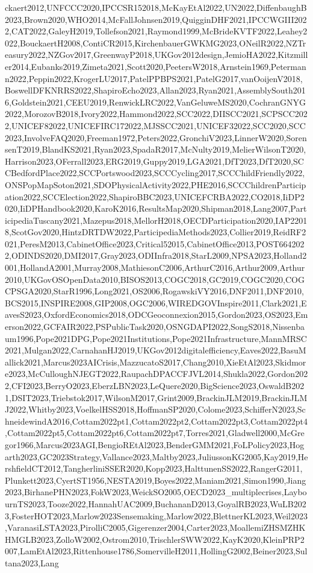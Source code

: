 \documentclass[a4paper]{article} %
\begin{document}
\begin{refsection}
ckaert2012,UNFCCC2020,IPCCSR152018,McKayEtAl2022,UN2022,DiffenbaughB2023,Brown2020,WHO2014,McFallJohnsen2019,QuigginDHF2021,IPCCWGIII2022,CAT2022,GaleyH2019,Tollefson2021,Raymond1999,McBrideKVTF2022,Leahey2022,BouckaertH2008,ContiCR2015,KirchenbauerGWKMG2023,ONeilR2022,NZTreasury2022,NZGov2017,GreenwayP2018,UKGov2012design,JemioHA2022,Kitzmiller2014,Eubanks2019,Zimeta2021,Scott2020,PeetersW2018,Arnstein1969,Petermann2022,Peppin2022,KrogerLU2017,PatelPPBPS2021,PatelG2017,vanOoijenV2018,BoswellDFKNRRS2022,ShapiroEcho2023,Allan2023,Ryan2021,AssemblySouth2016,Goldstein2021,CEEU2019,RenwickLRC2022,VanGeluweMS2020,CochranGNYG2022,MorozovB2018,Ivory2022,Hammond2022,SCC2022,DIISCC2021,SCPSCC2022,UNICEF82022,UNICEFIRC172022,MJSSCC2021,UNICEF32022,SCC2020,SCC2023,InvolveFAQ2020,Freeman1972,Peters2022,GronchiV2023,LinnerW2020,SorensenT2019,BlandKS2021,Ryan2023,SpadaR2017,McNulty2019,MelierWilsonT2020,Harrison2023,OFerrall2023,ERG2019,Guppy2019,LGA2021,DfT2023,DfT2020,SCCBedfordPlace2022,SCCPortswood2023,SCCCycling2017,SCCChildFriendly2022,ONSPopMapSoton2021,SDOPhysicalActivity2022,PHE2016,SCCChildrenParticipation2022,SCCElection2022,ShapiroBBC2023,UNICEFCRBA2022,CO2018,IiDP2020,IiDPHandbook2020,KaroK2016,ResultsMap2020,Shipman2018,Lang2007,ParticipediaTuscany2021,Mazepus2018,MellorH2018,OECDParticipation2020,IAP22018,ScotGov2020,HintzDRTDW2022,ParticipediaMethods2023,Collier2019,ReidRF2021,PeresM2013,CabinetOffice2023,Critical52015,CabinetOffice2013,POST6642022,ODINDS2020,DMI2017,Gray2023,ODIInfra2018,StarL2009,NPSA2023,Holland2001,HollandA2001,Murray2008,MathiesonC2006,ArthurC2016,Arthur2009,Arthur2010,UKGovOSOpenData2010,BISOS2013,COGC2018,GC2019,COGC2020,COGCPSGA2020,StarR1996,Long2021,OS2006,RogawskiVY2016,DNF2011,DNF2010,BCS2015,INSPIRE2008,GIP2008,OGC2006,WIREDGOVInspire2011,Clark2021,EavesS2023,OxfordEconomics2018,ODCGeoconnexion2015,Gordon2023,OS2023,Emerson2022,GCFAIR2022,PSPublicTask2020,OSNGDAPI2022,SongS2018,Nissenbaum1996,Pope2021DPG,Pope2021Institutions,Pope2021Infrastructure,MannMRSC2021,Mulgan2022,CarnahanHJ2019,UKGov2012digitalefficiency,Eaves2022,BasuMallick2021,Marcus2023AICrisis,MazzucatoS2017,Chang2010,XieEtAl2023,Skidmore2023,McCulloughNJEGT2022,RaupachDPACCFJVL2014,Shukla2022,Gordon2022,CFI2023,BerryO2023,EberzLBN2023,LeQuere2020,BigScience2023,OswaldB2021,DSIT2023,Triebstok2017,WilsonM2017,Grint2009,BrackinJLM2019,BrackinJLMJ2022,Whitby2023,VoelkelHSS2018,HoffmanSP2020,Colome2023,SchifferN2023,SchneidewindA2016,Cottam2022pt1,Cottam2022pt2,Cottam2022pt3,Cottam2022pt4,Cottam2022pt5,Cottam2022pt6,Cottam2022pt7,Torres2021,Gladwell2000,McGregor1966,Marcus2023AGI,BengioREtAl2023,BenderGMM2021,FoLPolicy2023,Hogarth2023,GC2023Strategy,Vallance2023,Maltby2023,JuliussonKG2005,Kay2019,HershfieldCT2012,TangherliniSSER2020,Kopp2023,HalttunenSS2022,RangerG2011,Plunkett2023,CyertST1956,NESTA2019,Boyes2022,Maniam2021,Simon1990,Jiang2023,BirhanePHN2023,FokW2023,WeickSO2005,OECD2023_multiplecrises,LaybournTS2023,Tooze2022,HannahUAC2009,BuchananD2013,GoyalRB2023,WuLB2023,FosterHOT2023,Marlow2023Sensemaking,Marlow2022,BlettnerKL2023,Weil2023,VaranasiLSTA2023,PirolliC2005,Gigerenzer2004,Carter2023,MoallemiZHSMZHKHMGLB2023,ZolloW2002,Ostrom2010,TrischlerSWW2022,KayK2020,KleinPRP2007,LamEtAl2023,Rittenhouse1786,SomervilleH2011,HollingG2002,Beiner2023,Sultana2023,Lang
\end{refsection}
\end{document}
